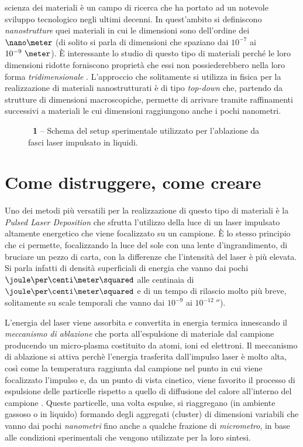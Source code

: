  scienza dei materiali è un campo di ricerca che ha portato ad un notevole sviluppo tecnologico negli ultimi decenni.
In quest'ambito si definiscono \emph{nanostrutture} quei materiali in cui le dimensioni sono dell'ordine dei $\nano\meter$ (di solito si parla di dimensioni che spaziano dai $10^{-7}$ ai $10^{-9}~\meter$).
È interessante lo studio di questo tipo di materiali perché le loro dimensioni ridotte forniscono proprietà che essi non possiederebbero nella loro forma \emph{tridimensionale} \cite{Vajtai,Lindsay}.
L'approccio che solitamente si utilizza in fisica per la realizzazione di materiali nanostrutturati è di tipo \emph{top-down} che, partendo da strutture di dimensioni macroscopiche, permette di arrivare tramite raffinamenti successivi a materiali le cui dimensioni raggiungono anche i pochi nanometri.

\begin{figure}[!b]
\begin{center}
\caption{\textbf{\figurename~1} -- Schema del setup sperimentale utilizzato per l'ablazione da fasci laser impulsato in liquidi.}
\label{fig:setup}
\end{center}
\vskip-20pt
\end{figure}

\section*{Come distruggere, come creare}
Uno dei metodi più versatili per la realizzazione di questo tipo di materiali è la \emph{Pulsed Laser Deposition} che sfrutta l'utilizzo della luce di un laser impulsato altamente energetico che viene focalizzato su un campione. È lo stesso principio che ci permette, focalizzando la luce del sole con una lente d'ingrandimento, di bruciare un pezzo di carta, con la differenze che l'intensità del laser è più elevata. Si parla infatti di densità superficiali di energia che vanno dai pochi $\joule\per\centi\meter\squared$ alle centinaia di $\joule\per\centi\meter\squared$ e di un tempo di rilascio molto più breve, solitamente su scale temporali che vanno dai $10^{-9}$ ai $10^{-12}~\second$). 

L'energia del laser viene assorbita e convertita in energia termica innescando il \emph{meccanismo di ablazione} che porta all'espulsione di materiale dal campione producendo un micro-plasma costituito da atomi, ioni ed elettroni. Il meccanismo di ablazione si attiva perchè l'energia trasferita dall'impulso laser è molto alta, così come la temperatura raggiunta dal campione nel punto in cui viene focalizzato l'impulso e, da un punto di vista cinetico, viene favorito il processo di espulsione delle particelle rispetto a quello di diffusione del calore all'interno del campione \cite{Chrisey}. Queste particelle, una volta espulse, si riaggregano (in ambiente gassoso o in liquido) formando degli aggregati (cluster) di dimensioni variabili che vanno dai pochi \emph{nanometri} fino anche a qualche frazione di \emph{micrometro}, in base alle condizioni sperimentali che vengono utilizzate per la loro sintesi.

